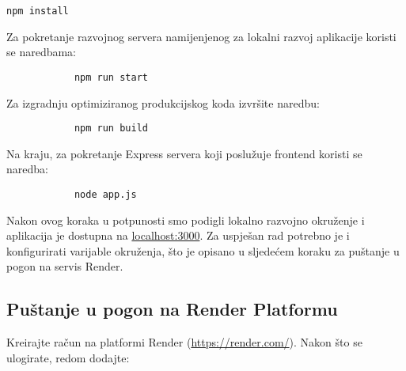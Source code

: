 			\texttt{npm install}

			Za pokretanje razvojnog servera namijenjenog za lokalni razvoj aplikacije koristi se naredbama:
			
			\begin{verbatim}
			npm run start
			\end{verbatim}
			
			Za izgradnju optimiziranog produkcijskog koda izvršite naredbu:
			
			\begin{verbatim}
			npm run build
			\end{verbatim}
			
			Na kraju, za pokretanje Express servera koji poslužuje frontend koristi se naredba:
			
			\begin{verbatim}
			node app.js
			\end{verbatim}
			
			Nakon ovog koraka u potpunosti smo podigli lokalno razvojno okruženje i aplikacija je dostupna na \url{localhost:3000}. Za uspješan rad potrebno je i konfigurirati varijable okruženja, što je opisano u sljedećem koraku za puštanje u pogon na servis Render.
			
			\subsection{Puštanje u pogon na Render Platformu}
			
			Kreirajte račun na platformi Render (\url{https://render.com/}). Nakon što se ulogirate, redom dodajte:
			
